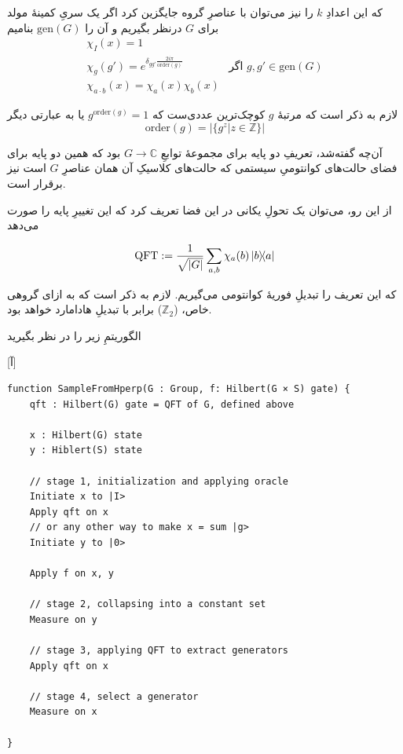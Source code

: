 که این اعدادِ \(k\) را نیز می‌توان با عناصرِ گروه جایگزین کرد اگر یک سریِ کمینهٔ مولد برای \(G\) درنظر بگیریم و آن را 
\(\mathrm{gen}(G)\)
بنامیم
\begin{eqnarray}
\chi_I(x) = 1 \\
\chi_g(g') = e^{\delta_{gg'}\frac{2i\pi}{\mathrm{order}(g)}} & \text{اگر \(g, g' \in \mathrm{gen}(G)\)} \\
\chi_{a \cdot b}(x) = \chi_a(x) \chi_b(x) 
\end{eqnarray}

لازم به ذکر است که مرتبهٔ \(g\) کوچک‌ترین عددی‌ست که \(g^{\mathrm{order}(g)} = 1\) یا به عبارتی دیگر
\begin{equation}
    \mathrm{order}(g) = |\{ g^z | z \in \mathbb{Z}\}|
\end{equation}

آن‌چه گفته‌شد، تعریفِ دو پایه برای مجموعهٔ توابعِ \(G \to \mathbb{C}\) بود که همین دو پایه برای فضای حالت‌های کوانتومیِ سیستمی که حالت‌های کلاسیکِ آن همان عناصرِ \(G\) است نیز برقرار است.

از این رو، می‌توان یک تحولِ یکانی در این فضا تعریف کرد که این تغییرِ پایه را صورت می‌دهد

\begin{equation}
    \mathrm{QFT} := \frac{1}{\sqrt{\abs{G}}} \sum_{a, b} \chi_a(b) \dyad{b}{a}  
\end{equation}

که این تعریف را تبدیلِ فوریهٔ کوانتومی می‌گیریم. لازم به ذکر است که به ازای گروهی خاص، (\(\mathbb{Z}_2\)) برابر با تبدیلِ هادامارد خواهد بود.

الگوریتمِ زیر را در نظر بگیرید

[آ]

\begin{latin}
\begin{lstlisting}
function SampleFromHperp(G : Group, f: Hilbert(G × S) gate) {
    qft : Hilbert(G) gate = QFT of G, defined above
    
    x : Hilbert(G) state
    y : Hiblert(S) state
    
    // stage 1, initialization and applying oracle
    Initiate x to |I>
    Apply qft on x
    // or any other way to make x = sum |g>
    Initiate y to |0>
    
    Apply f on x, y
    
    // stage 2, collapsing into a constant set
    Measure on y
    
    // stage 3, applying QFT to extract generators
    Apply qft on x
    
    // stage 4, select a generator
    Measure on x
     
}
\end{lstlisting}
\end{latin}

